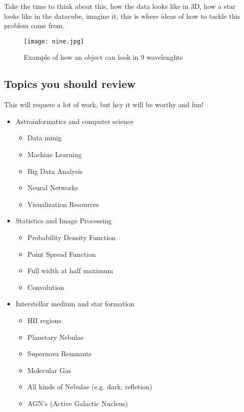 \documentclass[11pt,fleqn]{book} %
\begin{document}
Take the time to think about this, how the data looks like in 3D, how a star looks like in the datacube, imagine it, this is where ideas of how to tackle this problem come from.
\begin{figure}
	\centering
    \texttt{[image: nine.jpg]}
    \caption{Example of how an object can look in 9 wavelenghts}
    \label{fig:nine}
\end{figure}

\subsection{Topics you should review}
This will requere a lot of work, but hey it will be worthy and fun!
\begin{itemize}
	\item Astroinformatics and computer science
    	\begin{itemize}
        	\item Data minig
            \item Machine Learning
            \item Big Data Analysis
            \item Neural Networks
            \item Visualization Resources
        \end{itemize}
    \item Statistics and Image Processing
    	\begin{itemize}
        	\item Probability Density Function
            \item Point Spread Function
            \item Full width at half maximum
            \item Convolution
        \end{itemize}
    \item Interstellar medium and star formation
    	\begin{itemize}
        	\item HII regions
            \item Planetary Nebulae
            \item Supernova Remnants
            \item Molecular Gas
            \item All kinds of Nebulae (e.g. dark, refletion)
            \item AGN's (Active Galactic Nucleus)
        \end{itemize}

\end{itemize}
\end{document}
